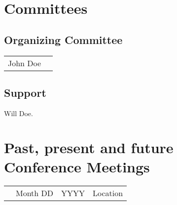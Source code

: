 \section*{Committees}

\subsection*{Organizing Committee}

\begin{tabular}{ll}
	John Doe
\end{tabular}				

\subsection*{Support}

Will Doe.

\section*{Past, present and future Conference Meetings}

\begingroup
\footnotesize
\begin{tabular}{llll}

{\color{halfgray}{$\bullet$}} & Month DD & YYYY   & Location \\
\end{tabular}
\endgroup

\newpage
